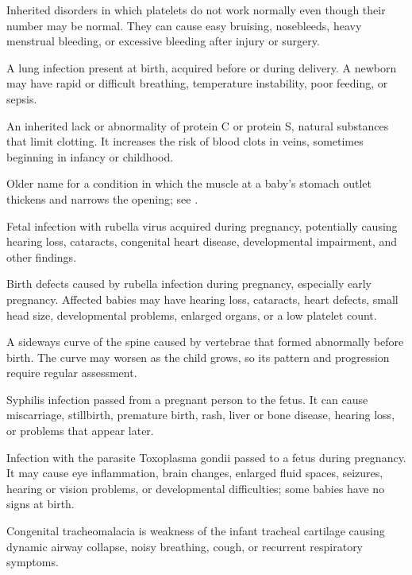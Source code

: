  Inherited disorders in which platelets do not work normally even though their number may be normal. They can cause easy bruising, nosebleeds, heavy menstrual bleeding, or excessive bleeding after injury or surgery.

 A lung infection present at birth, acquired before or during delivery. A newborn may have rapid or difficult breathing, temperature instability, poor feeding, or sepsis.

 An inherited lack or abnormality of protein C or protein S, natural substances that limit clotting. It increases the risk of blood clots in veins, sometimes beginning in infancy or childhood.

 Older name for a condition in which the muscle at a baby’s stomach outlet thickens and narrows the opening; see .

 Fetal infection with rubella virus acquired during pregnancy, potentially causing hearing loss, cataracts, congenital heart disease, developmental impairment, and other findings.

 Birth defects caused by rubella infection during pregnancy, especially early pregnancy. Affected babies may have hearing loss, cataracts, heart defects, small head size, developmental problems, enlarged organs, or a low platelet count.

 A sideways curve of the spine caused by vertebrae that formed abnormally before birth. The curve may worsen as the child grows, so its pattern and progression require regular assessment.

 Syphilis infection passed from a pregnant person to the fetus. It can cause miscarriage, stillbirth, premature birth, rash, liver or bone disease, hearing loss, or problems that appear later.

 Infection with the parasite Toxoplasma gondii passed to a fetus during pregnancy. It may cause eye inflammation, brain changes, enlarged fluid spaces, seizures, hearing or vision problems, or developmental difficulties; some babies have no signs at birth.

 Congenital tracheomalacia is weakness of the infant tracheal cartilage causing dynamic airway collapse, noisy breathing, cough, or recurrent respiratory symptoms.

